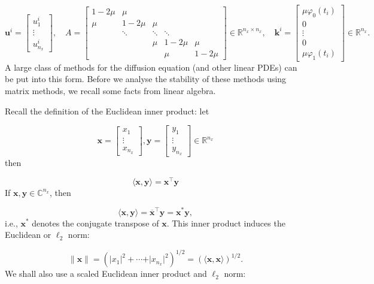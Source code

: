 \documentclass[12pt,a4paper]{article}
\begin{document}
\[
\mathbf{u}^i = \begin{bmatrix}
u^{i}_{1} \\
\vdots \\
u^{i}_{n_x}
\end{bmatrix}, \quad A = \begin{bmatrix}
1 - 2\mu & \mu & & & \\
\mu  & 1-2\mu & \mu  & & \\
      & \ddots & \ddots & \ddots & \\
      &        & \mu    & 1- 2\mu & \mu \\
      &        &        &\mu      & 1-2\mu
\end{bmatrix} \in \mathbb{R}^{n_x \times n_x}, \quad \mathbf{k}^i=
\begin{bmatrix}
\mu\varphi_0(t_i) \\
0 \\
\vdots \\
0 \\
\mu \varphi_1(t_i)
\end{bmatrix} \in \mathbb{R}^{n_x}.
\]
A large class of methods for the diffusion equation (and other linear PDEs) can be put into this form.  Before we analyse the stability of these methods using matrix methods, we recall some facts from linear algebra.

Recall the definition of the Euclidean inner product: let

\[
\mathbf{x} = \begin{bmatrix}
x_1 \\
\vdots \\
x_{n_x}
\end{bmatrix},  \mathbf{y} = \begin{bmatrix}
y_1 \\
\vdots \\
y_{n_x}
\end{bmatrix}  \in \mathbb{R}^{n_x}
\]
then

\[
\langle \mathbf{x}, \mathbf{y}\rangle = \mathbf{x}^{\top}\mathbf{y}
\]
If $\mathbf{x}, \mathbf{y} \in \mathbb{C}^{n_x}$, then

\[
\langle \mathbf{x}, \mathbf{y}\rangle = \overline{\mathbf{x}}^{\top}\mathbf{y} = \mathbf{x}^*\mathbf{y},
\]
i.e., $\mathbf{x}^*$ denotes the conjugate transpose of $\mathbf{x}$. This inner product induces the Euclidean or $\ell_2$ norm:

\[
\| \mathbf{x} \| = \left(\vert x_1\vert^2 + \cdots + \vert x_{n_x}\vert^2  \right)^{1/2}  = \left(\langle\mathbf{x},\mathbf{x}\rangle\right)^{1/2}.
\]
We shall also use a scaled Euclidean inner product and $\ell_2$ norm:
\end{document}
